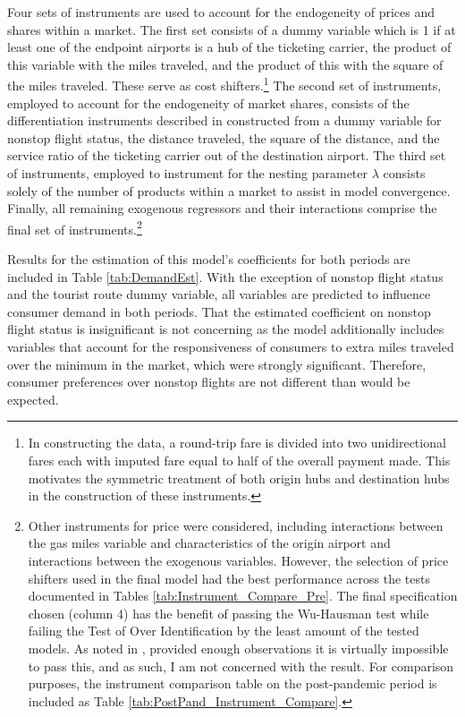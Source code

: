 \documentclass{article}
\begin{document}
	 Four sets of instruments are used to account for the endogeneity of prices and shares within a market. The first set consists of a dummy variable which is 1 if at least one of the endpoint airports is a hub of the ticketing carrier, the product of this variable with the miles traveled, and the product of this with the square of the miles traveled. These serve as cost shifters.\footnote{In constructing the data, a round-trip fare is divided into two unidirectional fares each with imputed fare equal to half of the overall payment made. This motivates the symmetric treatment of both origin hubs and destination hubs in the construction of these instruments.} The second set of instruments, employed to account for the endogeneity of market shares, consists of the differentiation instruments described in \citet{gandhi_measuring_2019} constructed from a dummy variable for nonstop flight status, the distance traveled, the square of the distance, and the service ratio of the ticketing carrier out of the destination airport. The third set of instruments, employed to instrument for the nesting parameter $\lambda$ consists solely of the number of products within a market to assist in model convergence. Finally, all remaining exogenous regressors and their interactions comprise the final set of instruments.\footnote{Other instruments for price were considered, including interactions between the gas miles variable and characteristics of the origin airport and interactions between the exogenous variables. However, the selection of price shifters used in the final model had the best performance across the tests documented in Tables \ref{tab:Instrument_Compare_Pre}. The final specification chosen (column 4) has the benefit of passing the Wu-Hausman test while failing the Test of Over Identification by the least amount of the tested models. As noted in \citet{nevo_measuring_2001}, provided enough observations it is virtually impossible to pass this, and as such, I am not concerned with the result. For comparison purposes, the instrument comparison table on the post-pandemic period is included as Table \ref{tab:PostPand_Instrument_Compare}.}
	
    Results for the estimation of this model's coefficients for both periods are included in Table \ref{tab:DemandEst}. With the exception of nonstop flight status and the tourist route dummy variable, all variables are predicted to influence consumer demand in both periods. That the estimated coefficient on nonstop flight status is insignificant is not concerning as the model additionally includes variables that account for the responsiveness of consumers to extra miles traveled over the minimum in the market, which were strongly significant. Therefore, consumer preferences over nonstop flights are not different than would be expected.  
    
\end{document}
